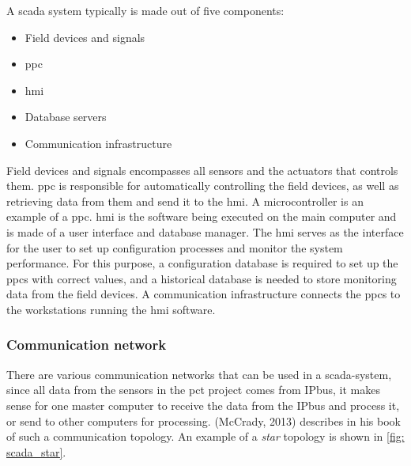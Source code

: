 \documentclass[main.tex]{subfiles}
\begin{document}
A \gls{scada} system typically is made out of five components:

\begin{itemize}
    \item Field devices and signals
    \item \acrfull{ppc}
    \item \acrfull{hmi}
    \item Database servers
    \item Communication infrastructure
\end{itemize}

Field devices and signals encompasses all sensors and the actuators that controls them. \gls{ppc} is responsible for automatically controlling the field devices, as well as retrieving data from them and send it to the \gls{hmi}. A microcontroller is an example of a \gls{ppc}. \gls{hmi} is the software being executed on the main computer and is made of a user interface and database manager. The \gls{hmi} serves as the interface for the user to set up configuration processes and monitor the system performance. For this purpose, a configuration database is required to set up the \gls{ppc}s with correct values, and a historical database is needed to store monitoring data from the field devices. A communication infrastructure connects the \gls{ppc}s to the workstations running the  \gls{hmi} software.

\subsubsection{Communication network}
There are various communication networks that can be used in a \gls{scada}-system, since all data from the sensors in the \gls{pct} project comes from IPbus, it makes sense for one master computer to receive the data from the IPbus and process it, or send to other computers for processing. (McCrady, 2013) describes in his book of such a communication topology\cite{scada_design}. An example of a \textit{star} topology is shown in \autoref{fig: scada_star}.
\end{document}

